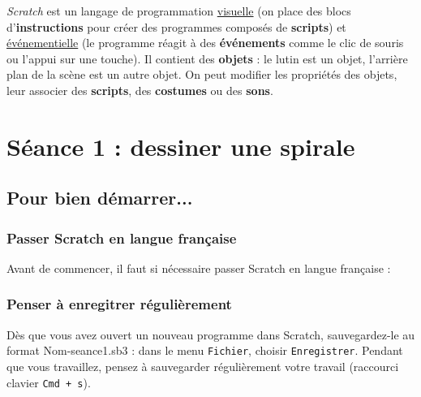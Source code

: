 \emph{Scratch} est un langage de programmation \underline{visuelle} (on place des blocs d'\textbf{instructions} pour créer des programmes composés de \textbf{scripts}) et \underline{événementielle} (le programme réagit à des \textbf{événements} comme le clic de souris ou l'appui sur une touche). Il contient des \textbf{objets} : le lutin est un objet, l'arrière plan de la scène est un autre objet. On peut modifier les propriétés des objets, leur associer des \textbf{scripts}, des \textbf{costumes} ou des \textbf{sons}.   




















%
%
%
%



\section{Séance 1 : dessiner une spirale}\label{ficheScratch5e1}

\subsection{Pour bien démarrer...}

\subsubsection{Passer Scratch en langue française} 

Avant de commencer, il faut si nécessaire passer Scratch en langue française :




\subsubsection{Penser à enregitrer régulièrement}

Dès que vous avez ouvert un nouveau programme dans Scratch, sauvegardez-le au format Nom-seance1.sb3 : dans le menu \texttt{Fichier}, choisir \texttt{Enregistrer}. Pendant que vous travaillez, pensez à sauvegarder régulièrement votre travail (raccourci clavier \texttt{Cmd + s}).   

